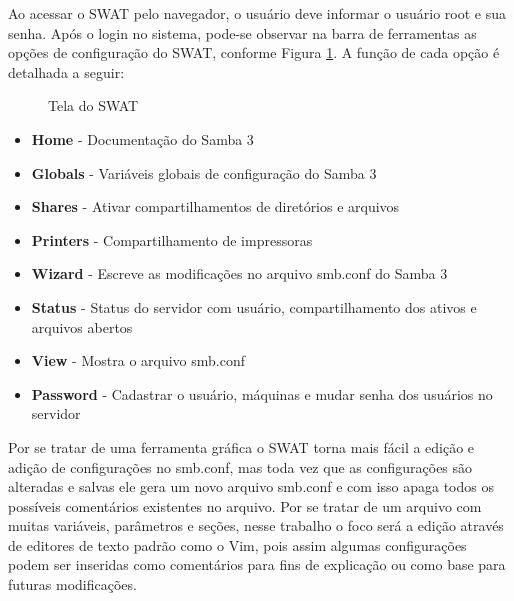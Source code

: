 Ao acessar o SWAT pelo navegador, o usuário deve informar o usuário root e sua senha. Após o login no sistema, pode-se observar na barra de ferramentas as opções de configuração do SWAT, conforme Figura \ref{swat}. A função de cada opção é detalhada a seguir:

\begin{figure}[ht]
   	\centering
   	\caption{Tela do SWAT}
    \label{swat}
\end{figure}

\begin{itemize}
    \item \textbf{Home} - Documentação do Samba 3
    \item \textbf{Globals} - Variáveis globais de configuração do Samba 3
    \item \textbf{Shares} - Ativar compartilhamentos de diretórios e arquivos
    \item \textbf{Printers} - Compartilhamento de impressoras
    \item \textbf{Wizard} - Escreve as modificações no arquivo smb.conf do Samba 3
    \item \textbf{Status} - Status do servidor com usuário, compartilhamento dos ativos e arquivos abertos
    \item \textbf{View} - Mostra o arquivo smb.conf
    \item \textbf{Password} - Cadastrar o usuário, máquinas e mudar senha dos usuários no servidor
\end{itemize}

Por se tratar de uma ferramenta gráfica o SWAT torna mais fácil a edição e adição de configurações no smb.conf, mas toda vez que as configurações são alteradas e salvas ele gera um novo arquivo smb.conf e com isso apaga todos os possíveis comentários existentes no arquivo. Por se tratar de um arquivo com muitas variáveis, parâmetros e seções, nesse trabalho o foco será a edição através de editores de texto padrão como o Vim, pois assim algumas configurações podem ser inseridas como comentários para fins de explicação ou como base para futuras modificações.

